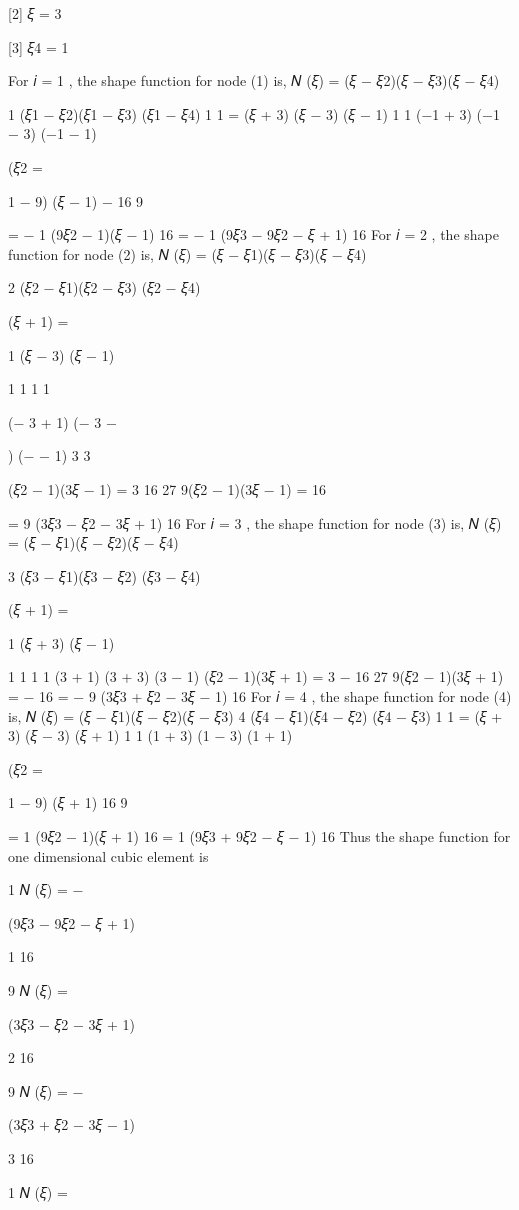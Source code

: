 {{{{[2]	𝜉  =  
3
 
[3]	𝜉4 = 1
 


For 𝑖 = 1 , the shape function for node (1) is,
𝑁 (𝜉) =	(𝜉 − 𝜉2)(𝜉 − 𝜉3)(𝜉 − 𝜉4)
 
1	(𝜉1 − 𝜉2)(𝜉1 − 𝜉3) (𝜉1 − 𝜉4)
1	1
=	(𝜉 + 3) (𝜉 − 3) (𝜉 − 1)
1	1
(−1 + 3) (−1 − 3) (−1 − 1)

 
(𝜉2
=
 
1
− 9) (𝜉 − 1)
− 16
9
 
= − 1 (9𝜉2 − 1)(𝜉 − 1)
16
= − 1 (9𝜉3 − 9𝜉2 − 𝜉 + 1)
16
For 𝑖 = 2 , the shape function for node (2) is,
𝑁 (𝜉) =	(𝜉 − 𝜉1)(𝜉 − 𝜉3)(𝜉 − 𝜉4)
 
2	(𝜉2 − 𝜉1)(𝜉2 − 𝜉3) (𝜉2 − 𝜉4)

 
(𝜉 + 1)
=
 
1
(𝜉 − 3) (𝜉 − 1)
 
1	1	1	1
 
(− 3 + 1) (− 3 −
 
) (−	− 1)
3	3
 
(𝜉2 − 1)(3𝜉 − 1)
= 	3	
16
27
9(𝜉2 − 1)(3𝜉 − 1)
=
16
 
= 9 (3𝜉3 − 𝜉2 − 3𝜉 + 1)
16
For 𝑖 = 3 , the shape function for node (3) is,
𝑁 (𝜉) =	(𝜉 − 𝜉1)(𝜉 − 𝜉2)(𝜉 − 𝜉4)
 
3	(𝜉3 − 𝜉1)(𝜉3 − 𝜉2) (𝜉3 − 𝜉4)

 
(𝜉 + 1)
=
 
1
(𝜉 + 3) (𝜉 − 1)
 
1	1	1	1
(3 + 1) (3 + 3) (3 − 1)
(𝜉2 − 1)(3𝜉 + 1)
= 	3	
− 16
27
9(𝜉2 − 1)(3𝜉 + 1)
= −
16
= − 9 (3𝜉3 + 𝜉2 − 3𝜉 − 1)
16
For 𝑖 = 4 , the shape function for node (4) is,
𝑁 (𝜉) =	(𝜉 − 𝜉1)(𝜉 − 𝜉2)(𝜉 − 𝜉3)
4	(𝜉4 − 𝜉1)(𝜉4 − 𝜉2) (𝜉4 − 𝜉3)
1	1
= (𝜉 + 3) (𝜉 − 3) (𝜉 + 1)
1	1
(1 + 3) (1 − 3) (1 + 1)

 
(𝜉2
=
 
1
− 9) (𝜉 + 1)
16
9
 
= 1 (9𝜉2 − 1)(𝜉 + 1)
16
= 1 (9𝜉3 + 9𝜉2 − 𝜉 − 1)
16
Thus the shape function for one dimensional cubic element is

 
1
𝑁 (𝜉) = −
 
(9𝜉3 − 9𝜉2 − 𝜉 + 1)
 
 
1	16
 
9
𝑁 (𝜉) =
 
(3𝜉3 − 𝜉2 − 3𝜉 + 1)
 
 
2	16
 
9
𝑁 (𝜉) = −
 

(3𝜉3 + 𝜉2 − 3𝜉 − 1)
 
 
3	16
 
1
𝑁 (𝜉) =
 

}}}}
